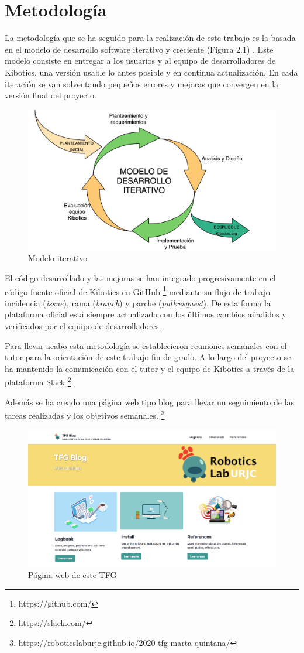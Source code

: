  
\section{Metodología}

La metodología que se ha seguido para la realización de este trabajo es la basada en el modelo de desarrollo software iterativo y creciente (Figura 2.1) \cite{modeloiter}.
Este modelo consiste en entregar a los usuarios y al equipo de desarrolladores de Kibotics, una versión usable lo antes posible y en continua actualización. En cada iteración se van solventando pequeños errores y mejoras que convergen en la versión final del proyecto.

\begin{figure}[H]
    \centering
    \includegraphics[width=0.6\columnwidth]{chapters/images/metodologiaiterativa.png}
    \caption{Modelo iterativo}
    \label{fig:my_label}
\end{figure}


El código desarrollado y las mejoras se han integrado progresivamente en el código fuente oficial de Kibotics en GitHub \footnote{https://github.com/} mediante su flujo de trabajo  incidencia (\textit{issue}), rama (\textit{branch}) y parche (\textit{pullresquest}). De esta forma la plataforma oficial está siempre actualizada con los últimos cambios añadidos y verificados por el equipo de desarrolladores.

Para llevar acabo esta metodología se establecieron reuniones semanales con el tutor para la orientación de este trabajo fin de grado. A lo largo del proyecto se ha mantenido la comunicación con el tutor y el equipo de Kibotics a través de la plataforma Slack \footnote{https://slack.com/}. 



Además se ha creado una página web tipo blog para llevar un seguimiento de las tareas realizadas y los objetivos semanales. \footnote{https://roboticslaburjc.github.io/2020-tfg-marta-quintana/}

\begin{figure}[H]
    \centering
    \includegraphics[width=0.6\linewidth]{chapters/images/webtfg.png}
    \caption{Página web de este TFG}
    \label{fig:my_label}
\end{figure}

